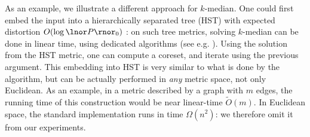 As an example, we illustrate a different approach for $k$-median. One could first embed the input into a hierarchically separated tree (HST) with expected distortion $O(\log \lnor P \rnor_0)$ \cite{FakcharoenpholRT03}: on such tree metrics, solving $k$-median can be done in linear time, using dedicated algorithms (see e.g. \cite{Cohen-AddadLNSS21}). Using the solution from the HST metric, one can compute a coreset, and iterate using the previous argument.
This embedding into HST is very similar to what is done by the \fkmeans algorithm, but can be actually performed in \emph{any} metric space, not only Euclidean. 
As an example, in a metric described by a graph with $m$ edges, the running time of this construction would be near linear-time $\tilde O(m)$. In Euclidean space, the standard implementation runs in time $\Omega(n^2)$: we therefore omit it from our experiments.
